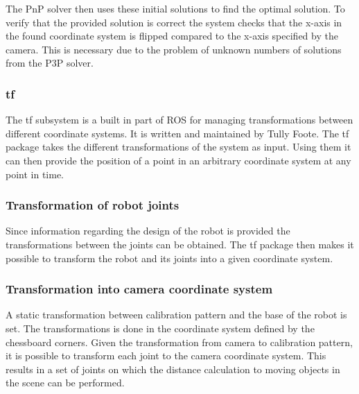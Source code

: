 The PnP solver then uses these initial solutions to find the optimal solution.
To verify that the provided solution is correct the system checks that the x-axis in the found coordinate system is flipped compared to the x-axis specified by the camera.
This is necessary due to the problem of unknown numbers of solutions from the P3P solver.


\subsubsection{tf}
The tf subsystem is a built in part of ROS for managing transformations between different coordinate systems. It is written and maintained by Tully Foote. The tf package takes the different transformations of the system as input. Using them it can then provide the position of a point in an arbitrary coordinate system at any point in time.

\subsubsection{Transformation of robot joints}
Since information regarding the design of the robot is provided the transformations between the joints can be obtained. The tf package then makes it possible to transform the robot and its joints into a given coordinate system.

\subsubsection{Transformation into camera coordinate system}
A static transformation between calibration pattern and the base of the robot is set. 
The transformations is done in the coordinate system defined by the chessboard corners.
Given the transformation from camera to calibration pattern, it is possible to transform each joint to the camera coordinate system. This results in a set of joints on which the distance calculation to moving objects in the scene can be performed. 
